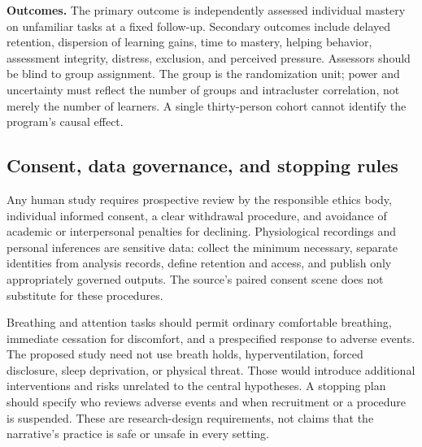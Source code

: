 \textbf{Outcomes.} The primary outcome is independently assessed individual mastery on unfamiliar tasks at a fixed follow-up. Secondary outcomes include delayed retention, dispersion of learning gains, time to mastery, helping behavior, assessment integrity, distress, exclusion, and perceived pressure. Assessors should be blind to group assignment. The group is the randomization unit; power and uncertainty must reflect the number of groups and intracluster correlation, not merely the number of learners. A single thirty-person cohort cannot identify the program's causal effect.

\subsection{Consent, data governance, and stopping rules}
Any human study requires prospective review by the responsible ethics body, individual informed consent, a clear withdrawal procedure, and avoidance of academic or interpersonal penalties for declining. Physiological recordings and personal inferences are sensitive data: collect the minimum necessary, separate identities from analysis records, define retention and access, and publish only appropriately governed outputs. The source's paired consent scene does not substitute for these procedures.

Breathing and attention tasks should permit ordinary comfortable breathing, immediate cessation for discomfort, and a prespecified response to adverse events. The proposed study need not use breath holds, hyperventilation, forced disclosure, sleep deprivation, or physical threat. Those would introduce additional interventions and risks unrelated to the central hypotheses. A stopping plan should specify who reviews adverse events and when recruitment or a procedure is suspended. These are research-design requirements, not claims that the narrative's practice is safe or unsafe in every setting.

